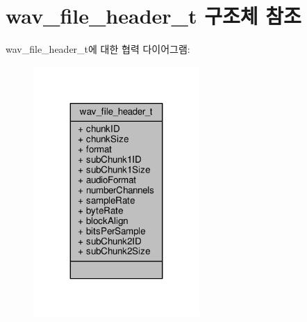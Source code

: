 \hypertarget{structwav__file__header__t}{}\section{wav\+\_\+file\+\_\+header\+\_\+t 구조체 참조}
\label{structwav__file__header__t}


wav\+\_\+file\+\_\+header\+\_\+t에 대한 협력 다이어그램\+:
\nopagebreak
\begin{figure}[H]
\begin{center}
\leavevmode
\includegraphics[width=179pt]{structwav__file__header__t__coll__graph}
\end{center}
\end{figure}
